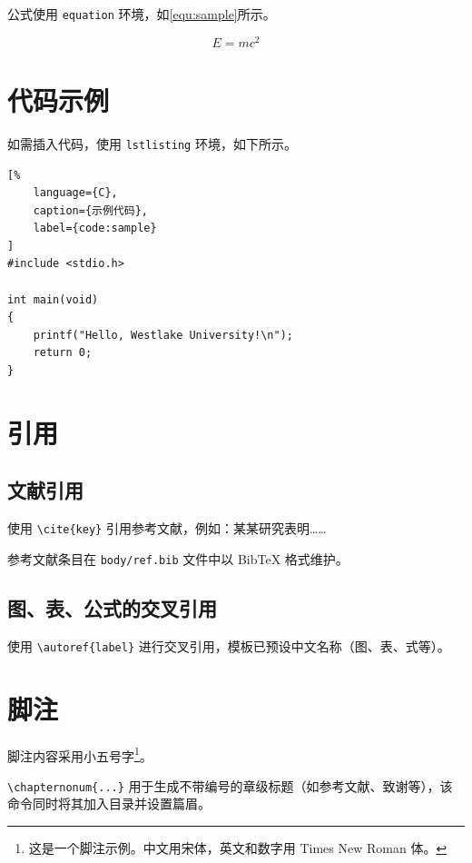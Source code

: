 公式使用 \texttt{equation} 环境，如\autoref{equ:sample}所示。

\begin{equation}
    \label{equ:sample}
    E = mc^2
\end{equation}

\section{代码示例}

如需插入代码，使用 \texttt{lstlisting} 环境，如下所示。

\begin{lstlisting}[%
    language={C},
    caption={示例代码},
    label={code:sample}
]
#include <stdio.h>

int main(void)
{
    printf("Hello, Westlake University!\n");
    return 0;
}
\end{lstlisting}

\section{引用}

\subsection{文献引用}

使用 \verb|\cite{key}| 引用参考文献，例如：某某研究\cite{sample-article}表明……

参考文献条目在 \texttt{body/ref.bib} 文件中以 BibTeX 格式维护。

\subsection{图、表、公式的交叉引用}

使用 \verb|\autoref{label}| 进行交叉引用，模板已预设中文名称（图、表、式等）。

\section{脚注}

脚注内容采用小五号字\footnote{这是一个脚注示例。中文用宋体，英文和数字用 Times New Roman 体。}。


\verb|\chapternonum{...}| 用于生成不带编号的章级标题（如参考文献、致谢等），该命令同时将其加入目录并设置篇眉。
